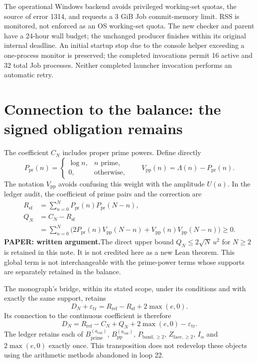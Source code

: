 \documentclass[11pt,a4paper]{article}
\theoremstyle{remark}
\newcommand{\Lam}{\Lambda}
\newcommand{\paper}{\textbf{PAPER: written argument.}\space}
\begin{document}
The operational Windows backend avoids privileged working-set quotas,
the source of error 1314, and requests a 3 GiB Job commit-memory limit.
RSS is monitored, not enforced as an OS working-set quota.
The new checker and parent have a 24-hour wall budget; the unchanged producer
finishes within its original internal deadline. An initial startup stop due
to the console helper exceeding a one-process monitor is preserved;
the completed invocations permit 16 active and 32 total Job processes.
Neither completed launcher invocation performs an automatic retry.

\clearpage
\section{Connection to the balance: the signed obligation remains}\label{sec:dn}
The coefficient $C_N$ includes proper prime powers.
Define directly
\[
P_{\mathrm{pr}}(n)=\begin{cases}\log n,&n\text{ prime},\\0,&\text{otherwise},\end{cases}
\qquad V_{\mathrm{pp}}(n)=\Lam(n)-P_{\mathrm{pr}}(n).
\]
The notation $V_{\mathrm{pp}}$ avoids confusing this weight with the amplitude
$U(a)$. In the ledger audit, the coefficient of prime pairs and the
correction are
\begin{align}
R_{\mathrm{sf}}&=\sum_{n=0}^N P_{\mathrm{pr}}(n)P_{\mathrm{pr}}(N-n),\\
Q_N&=C_N-R_{\mathrm{sf}}\nonumber\\
&=\sum_{n=0}^N\bigl(2P_{\mathrm{pr}}(n)V_{\mathrm{pp}}(N-n)
+V_{\mathrm{pp}}(n)V_{\mathrm{pp}}(N-n)\bigr)\ge0.
\label{eq:PP}
\end{align}
\paper The direct upper bound $Q_N\le2\sqrt N\,u^2$ for $N\ge2$
is retained in this note. It is not credited here as a new
Lean theorem. This global term is not interchangeable with the
prime-power terms whose supports are separately retained in the balance.

The monograph's bridge, within its stated scope, under its conditions and with exactly
the same support, retains
\begin{equation}\label{eq:ledger}
D_N+\varepsilon_{\mathrm{tr}}
=R_{\mathrm{ref}}-R_{\mathrm{sf}}+2\max(e,0).
\end{equation}
Its connection to the continuous coefficient is therefore
\begin{equation}\label{eq:gap}
D_N=R_{\mathrm{ref}}-C_N+Q_N+2\max(e,0)-\varepsilon_{\mathrm{tr}}.
\end{equation}
The ledger retains each of
$B_{\mathrm{prime}}^{(a_{\mathrm{cut}})}$,
$B_{\mathrm{pp}}^{(a_{\mathrm{cut}})}$,
$P_{\mathrm{band},\ge2}$, $Z_{\mathrm{face},\ge2}$, $I_\alpha$ and
$2\max(e,0)$ exactly once. This transposition does not redevelop these objects
using the arithmetic methods abandoned in loop 22.
\end{document}
